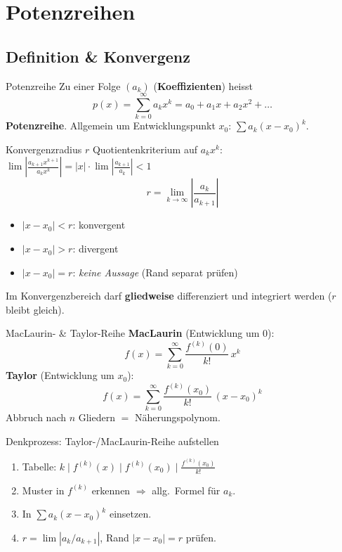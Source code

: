 \documentclass[a4paper, fontsize=7pt]{scrartcl}
\begin{document}
\section{Potenzreihen}

\subsection{Definition \& Konvergenz}

\begin{mainbox}{Potenzreihe}
Zu einer Folge $(a_k)$ (\textbf{Koeffizienten}) heisst
$$p(x) = \sum_{k=0}^{\infty} a_k x^k = a_0 + a_1 x + a_2 x^2 + \ldots$$
\textbf{Potenzreihe}. Allgemein um Entwicklungspunkt $x_0$:
$\sum a_k (x - x_0)^k$.
\end{mainbox}

\begin{mainbox}{Konvergenzradius $r$}
Quotientenkriterium auf $a_k x^k$:
$\lim \left|\frac{a_{k+1}x^{k+1}}{a_k x^k}\right| = |x| \cdot
\lim \left|\frac{a_{k+1}}{a_k}\right| < 1$
$$\boxed{r = \lim_{k\to\infty} \left|\frac{a_k}{a_{k+1}}\right|}$$
\begin{itemize}
    \item $|x - x_0| < r$: konvergent
    \item $|x - x_0| > r$: divergent
    \item $|x - x_0| = r$: \emph{keine Aussage} (Rand separat prüfen)
\end{itemize}
Im Konvergenzbereich darf \textbf{gliedweise} differenziert und integriert
werden ($r$ bleibt gleich).
\end{mainbox}

\begin{mainbox}{MacLaurin- \& Taylor-Reihe}
\textbf{MacLaurin} (Entwicklung um $0$):
$$f(x) = \sum_{k=0}^{\infty} \frac{f^{(k)}(0)}{k!}\, x^k$$
\textbf{Taylor} (Entwicklung um $x_0$):
$$f(x) = \sum_{k=0}^{\infty} \frac{f^{(k)}(x_0)}{k!}\, (x - x_0)^k$$
Abbruch nach $n$ Gliedern $=$ Näherungspolynom.
\end{mainbox}

\begin{subbox}{Denkprozess: Taylor-/MacLaurin-Reihe aufstellen}
\begin{enumerate}
    \item Tabelle: $k \mid f^{(k)}(x) \mid f^{(k)}(x_0) \mid
          \frac{f^{(k)}(x_0)}{k!}$
    \item Muster in $f^{(k)}$ erkennen $\Rightarrow$ allg.\ Formel für $a_k$.
    \item In $\sum a_k (x - x_0)^k$ einsetzen.
    \item $r = \lim |a_k / a_{k+1}|$, Rand $|x - x_0| = r$ prüfen.
\end{enumerate}
\end{subbox}
\end{document}
